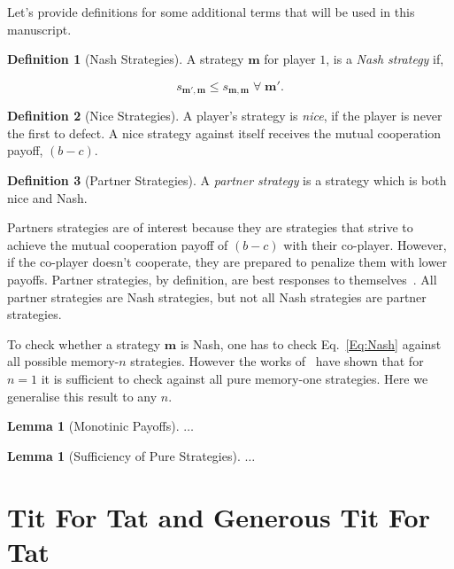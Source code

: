 \documentclass{article}
\theoremstyle{definition}
\newtheorem{definition}{Definition}[section]
\newtheorem{lemma}[theorem]{Lemma}
\begin{document}
Let's provide definitions for some additional terms that will be used in this
manuscript.

\begin{definition}[Nash Strategies]
A strategy $\mathbf{m}$ for player $1$, is a \textit{Nash
strategy} if,

\begin{equation}\label{Eq:Nash}
    s_{\mathbf{m'},\mathbf{m}} \leq s_{\mathbf{m},\mathbf{m}} \;\forall \; \mathbf{m'}.
\end{equation}
\end{definition}

\begin{definition}[Nice Strategies] A player's strategy is \textit{nice}, if
the player is never the first to defect. A nice strategy against itself receives
the mutual cooperation payoff, $(b - c)$.
\end{definition}

\begin{definition}[Partner Strategies]
A \textit{partner strategy} is a strategy which is both nice and Nash.
\end{definition}

Partners strategies are of interest because they are strategies that strive to
achieve the mutual cooperation payoff of $(b - c)$ with their co-player.
However, if the co-player doesn't cooperate, they are prepared to penalize them
with lower payoffs. Partner strategies, by definition, are best responses to
themselves~\citep{Hilbe:GEB:2015}. All partner
strategies are Nash strategies, but not all Nash strategies are partner
strategies.

To check whether a strategy \(\mathbf{m}\) is Nash, one has to check
Eq.~\eqref{Eq:Nash} against all possible memory-$n$ strategies. However the
works of~\citep{mcavoy:PRSA:2019, Mcavoy:PNAS:2022} have shown that for $n=1$ it
is sufficient to check against all pure memory-one strategies. Here we
generalise this result to any $n$.

\begin{lemma}[Monotinic Payoffs]\label{lemma:monotonic_payoffs}
$\dots$
\end{lemma}

\begin{lemma}[Sufficiency of Pure Strategies]\label{lemma:sufficiency_pure_strategies}
$\dots$
\end{lemma}

\section{Tit For Tat and Generous Tit For Tat}
\end{document}
